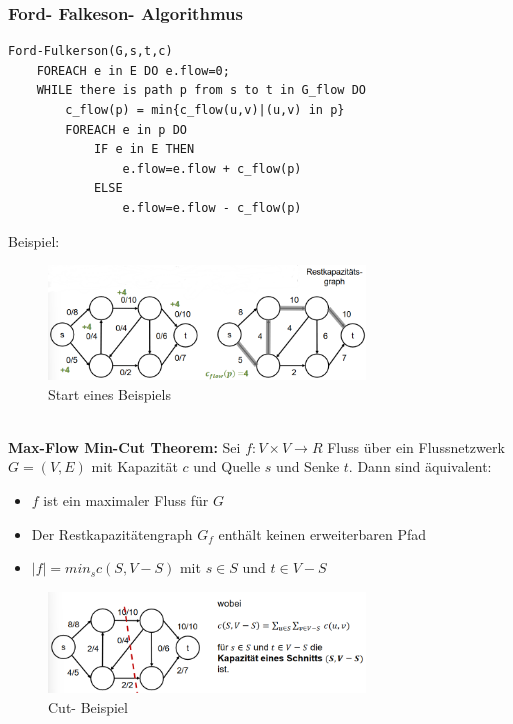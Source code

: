 \documentclass{article}
\begin{document}
            \subsubsection{Ford- Falkeson- Algorithmus}
                \begin{lstlisting}[style=pseudocode]
Ford-Fulkerson(G,s,t,c)
    FOREACH e in E DO e.flow=0;
    WHILE there is path p from s to t in G_flow DO
        c_flow(p) = min{c_flow(u,v)|(u,v) in p}
        FOREACH e in p DO
            IF e in E THEN
                e.flow=e.flow + c_flow(p)
            ELSE
                e.flow=e.flow - c_flow(p) 
                \end{lstlisting}
                Beispiel:\\
                \begin{figure}[ht]
                    \centering
                    \includegraphics[width=0.75\textwidth]{Bilder/FFBsp.png}
                    \caption{Start eines Beispiels}
                    \label{fig:FFBsp}
                \end{figure}\\
                \textbf{Max-Flow Min-Cut Theorem:} Sei $f:V\times V \rightarrow R$ Fluss über ein Flussnetzwerk $G=(V,E)$ mit Kapazität $c$ und Quelle $s$ und Senke $t$. Dann sind äquivalent:
                \begin{itemize}
                    \item $f$ ist ein maximaler Fluss für $G$
                    \item Der Restkapazitätengraph $G_f$ enthält keinen erweiterbaren Pfad
                    \item $|f|=min_sc(S,V-S)$ mit $s\in S$ und $t\in V-S$
                \end{itemize}
                \begin{figure}[ht]
                    \centering
                    \includegraphics[width=0.75\textwidth]{Bilder/MFMCT.png}
                    \caption{Cut- Beispiel}
                    \label{fig:MFMCT}
                \end{figure}
\end{document}
